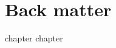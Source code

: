 
  \part{Back matter}

{chapter}
{chapter}


\begin{small}
  \printbibliography
\end{small}




\printindex
